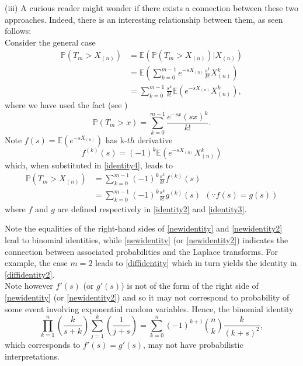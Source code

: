 \documentclass[11pt]{amsart}
\numberwithin{equation}{section}
\begin{document}
(iii) A curious reader might wonder if there exists a connection between these two approaches. Indeed, there is an interesting relationship between them, as seen follows:\\
Consider the general case 
\begin{align}
 \mathbb{P}(T_{m}>X_{(n)})&=\mathbb{E}(\mathbb{P}(T_{m}>X_{(n)})|X_{(n)})\nonumber\\
 &=\mathbb{E}\left(\sum_{k=0}^{m-1}e^{-sX_{(n)}}\frac{s^{k}}{k!}X_{(n)}^{k}\right)\nonumber\\
 &=\sum_{k=0}^{m-1}\frac{s^{k}}{k!}\mathbb{E}\left(e^{-sX_{(n)}}X_{(n)}^{k}\right),\label{identity4}
\end{align}
where we have used the fact (see \cite[equation (3.3.9)]{casella})
\begin{equation*}
 \mathbb{P}(T_{m}>x)=\sum_{k=0}^{m-1}\frac{e^{-sx}(sx)^{k}}{k!}.
\end{equation*}
Note $f(s)=\mathbb{E}(e^{-sX_{(n)}})$ has k-$th$ derivative
\begin{equation*}
 f^{(k)}(s)=(-1)^{k}\mathbb{E}\left(e^{-sX_{(n)}}X_{(n)}^{k}\right)
\end{equation*}
which, when substituted in \eqref{identity4}, leads to 
\begin{align}
 \mathbb{P}(T_{m}>X_{(n)})&=\sum_{k=0}^{m-1}(-1)^{k}\frac{s^{k}}{k!}f^{(k)}(s)\label{newidentity}\\
 &=\sum_{k=0}^{m-1}(-1)^{k}\frac{s^{k}}{k!}g^{(k)}(s)~~(\because f(s)=g(s))\label{newidentity2}
\end{align}
where $f$ and $g$ are defined respectively in \eqref{identity2} and \eqref{identity3}.

\noindent Note the equalities of the right-hand sides of \eqref{newidentity}  and \eqref{newidentity2} lead to binomial identities, while  \eqref{newidentity} (or \eqref{newidentity2}) indicates the connection between associated probabilities and the Laplace transforms.
For example, the case $m=2$ leads to \eqref{diffidentity} which in turn yields the identity in \eqref{diffidentity2}.\\
Note however $f'(s)$ (or $g'(s)$) is not of the form of the right side of \eqref{newidentity} (or \eqref{newidentity2}) and so it may not correspond to probability of some event involving exponential random variables. Hence, the binomial identity
\begin{equation*}
\prod_{k=1}^{n}\left(\frac{k}{s+k}\right)\sum_{j=1}^{k}\left(\frac{1}{j+s}\right)=\sum_{k=0}^{n}(-1)^{k+1}\binom{n}{k}\frac{k}{(k+s)^{2}},
\end{equation*}
which corresponds to $f'(s)=g'(s)$, may not have probabilistic interpretations. \\
 
\end{document}

